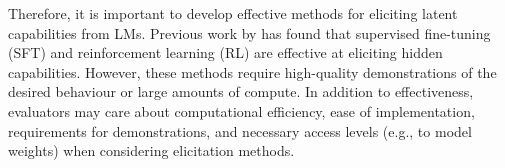 Therefore, it is important to develop effective methods for eliciting latent capabilities from LMs. Previous work by \cite{greenblatt2024stress} has found that supervised fine-tuning (SFT) and reinforcement learning (RL) are effective at eliciting hidden capabilities. However, these methods require high-quality demonstrations of the desired behaviour or large amounts of compute. In addition to effectiveness, evaluators may care about computational efficiency, ease of implementation, requirements for demonstrations, and necessary access levels (e.g., to model weights) when considering elicitation methods.  %


